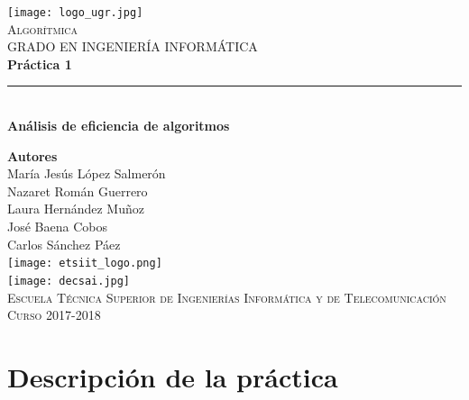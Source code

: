 \documentclass[12pt,spanish]{article}
\begin{document}
\begin{titlepage}

\newlength{\centeroffset}
\setlength{\centeroffset}{-0.5\oddsidemargin}
\addtolength{\centeroffset}{0.5\evensidemargin}
\thispagestyle{empty}

\noindent\hspace*{\centeroffset}
\begin{minipage}{\textwidth}

\centering
\texttt{[image: logo\_ugr.jpg]}\\[1.4cm]

\textsc{ \Large Algorítmica\\[0.2cm]}
\textsc{GRADO EN INGENIERÍA INFORMÁTICA}\\[1cm]

{\Huge\bfseries Práctica 1\\}
\noindent\rule[-1ex]{\textwidth}{3pt}\\[3.5ex]
{\large\bfseries Análisis de eficiencia de algoritmos}
\end{minipage}

\vspace{1.5cm}
\noindent\hspace*{\centeroffset}
\begin{minipage}{\textwidth}
\centering

\textbf{Autores}\\ {María Jesús López Salmerón \\ Nazaret Román Guerrero \\ Laura Hernández Muñoz \\ José Baena Cobos  \\ Carlos Sánchez Páez}\\[2.5ex]
\texttt{[image: etsiit\_logo.png]}\\[0.1cm]
\vspace{1.5cm}
\texttt{[image: decsai.jpg]}\\[0.1cm]
\vspace{1cm}
\textsc{Escuela Técnica Superior de Ingenierías Informática y de Telecomunicación}\\
\vspace{1cm}
\textsc{Curso 2017-2018}
\end{minipage}
\end{titlepage}
\tableofcontents
\thispagestyle{empty}
\listoftables
\newpage
\listoffigures
\newpage
\setcounter{page}{1}
\section{Descripción de la práctica}
\end{document}
